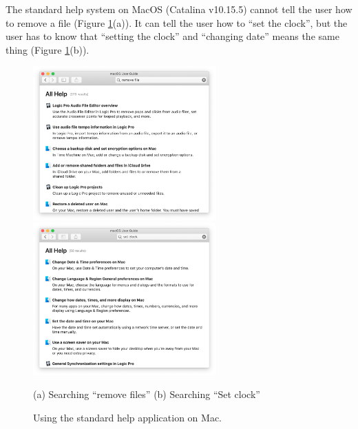 \documentclass[manuscript,anonymous,review]{acmart}
\begin{document}
The standard help system on MacOS (Catalina v10.15.5)
cannot tell the user how to remove a file (Figure \ref{machelp}(a)).
%
It can tell the user how to ``set the clock'', but
the user has to know that
``setting the clock'' and ``changing date'' means the same thing (Figure \ref{machelp}(b)).

\begin{figure}[H]
  \includegraphics[width=7cm,bb=-50 0 950 800]{figures/eaa80e41ddc3d3620fae133007274573.png}
  \includegraphics[width=7cm,bb=-50 0 950 800]{figures/0cd679128d8f69eb2a8a966d6466a8a4.png}
  \par
  (a) Searching ``remove files'' \hspace{3cm} (b) Searching ``Set clock''
  \caption{Using the standard help application on Mac.}
  \label{machelp}
\end{figure}

\end{document}
